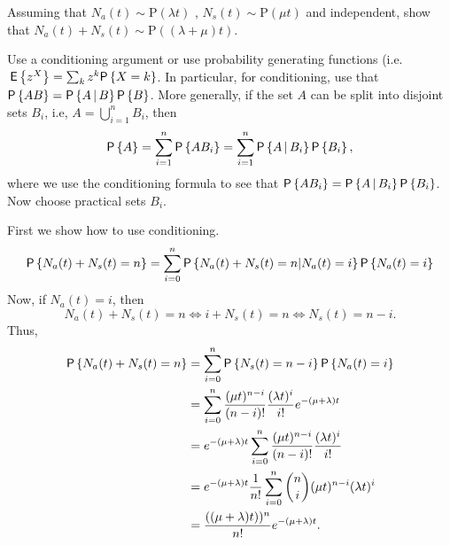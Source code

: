 \begin{exercise} 
 Assuming that
  $N_a(t)\sim \text{P}(\lambda t)$ , $N_s(t) \sim \text{P}(\mu t)$ and
  independent, show that
  $N_a(t) + N_s(t) \sim \text{P}((\lambda + \mu)t)$. 
  \begin{hint}
Use a conditioning argument or use probability generating
    functions (i.e. $\E{z^X}=\sum_k z^k \P{X=k}$. In particular, for
    conditioning, use that $\P{AB} = \P{A\given B}\P{B}$. More
    generally, if the set $A$ can be split into disjoint sets $B_i$,
    i.e, $A=\bigcup_{i=1}^n B_i$, then
    \begin{equation*}
      \P{A} = \sum_{i=1}^n \P{A B_i} = \sum_{i=1}^n \P{A\given B_i} \P{B_i},
    \end{equation*}
    where we use the conditioning formula to see that
    $\P{A B_i} = \P{A \given B_i} \P{B_i}$.  Now choose practical sets
    $B_i$.  
  \end{hint}
    \begin{solution}
First we show how to  use conditioning. 
  \begin{equation*}
    \begin{split}
\P{N_a(t) + N_s(t) = n} 
&= \sum_{i=0}^n \P{N_a(t) + N_s(t) = n|N_a(t) = i}\P{N_a(t)=i} \\
\end{split}
\end{equation*}
Now, if $N_a(t)=i$, then 
\begin{equation*}
N_a(t)+N_s(t) = n \iff 
i+N_s(t) = n \iff 
N_s(t) = n-i.
\end{equation*}
Thus,
  \begin{equation}\label{eq:002}
    \begin{split}
\P{N_a(t) + N_s(t) = n} 
&= \sum_{i=0}^n \P{ N_s(t) = n-i}\P{N_a(t)=i} \\
&= \sum_{i=0}^n \frac{(\mu t)^{n-i}}{(n-i)!} \frac{(\lambda t)^i}{i!} e^{-(\mu+\lambda)t} \\
&= e^{-(\mu+\lambda)t} \sum_{i=0}^n \frac{(\mu t)^{n-i}}{(n-i)!} \frac{(\lambda t)^i}{i!}  \\
&= e^{-(\mu+\lambda)t}\frac 1{n!} \sum_{i=0}^n {n \choose i }(\mu t)^{n-i}(\lambda t)^i  \\
&= \frac{((\mu+\lambda)t))^n}{n!}e^{-(\mu+\lambda)t}.
    \end{split}
  \end{equation}


\end{solution}
\end{exercise}
